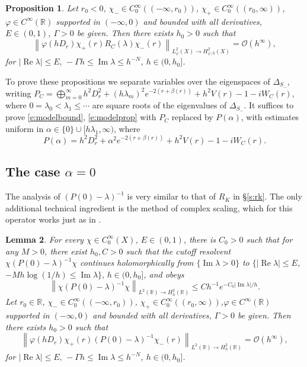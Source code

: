 \documentclass[reqno, 12pt]{amsart}
\newcommand \R {\mathbb{R}}
\newcommand \Oh {\mathcal{O}}
\DeclareMathOperator \re {Re}
\DeclareMathOperator \im {Im}
\newtheorem{prop}{Proposition}
\newtheorem{lem}[prop]{Lemma}
\theoremstyle{definition}
\numberwithin{equation}{section}
\numberwithin{prop}{section}
\numberwithin{figure}{section}
\begin{document}
\begin{prop}\label{p:modelprop}
Let $r_0 <0$, $\chi_- \in C_0^\infty((-\infty,r_0))$, $\chi_+ \in C_0^\infty((r_0,\infty))$, $\varphi \in C^\infty(\R)$ supported in $(-\infty,0)$ and bounded with all derivatives, $E \in (0,1)$, $\Gamma>0$ be given. Then there exists $h_0>0$ such that
\begin{equation}\label{e:modelprop}
\left\|\varphi(hD_r)\chi_+(r)R_C(\lambda)\chi_-(r)\right\|_{L^2_\varphi(X) \to H^2_{\varphi,h}(X)} = \Oh(h^\infty),
\end{equation}
 for $|\re \lambda| \le E, \, - \Gamma h \le \im \lambda \le h^{-N}$, $h \in (0,h_0]$.
 \end{prop}

To prove these propositions we separate variables over the eigenspaces of $\Delta_{S_-}$, writing $P_C = \bigoplus_{m=0}^\infty  h^2D_r^2 + (h\lambda_m)^2 e^{-2(r + \beta(r))} + h^2 V(r) - 1 - iW_C(r),$ 
where $0 = \lambda_0 < \lambda_1  \le \cdots$ are square roots of the eigenvalues of $\Delta_{S_-}$. It suffices to prove \eqref{e:modelbound}, \eqref{e:modelprop} with $P_C$ replaced by $P(\alpha)$,  with estimates uniform in $\alpha \in \{0\} \cup [h\lambda_1,\infty)$, where
\[
P(\alpha) = h^2D_r^2 + \alpha^2e^{-2(r + \beta(r))} + h^2 V(r) - 1 - iW_C(r).
\]

\subsection{The case $\alpha = 0$}  The analysis of $(P(0) - \lambda)^{-1}$ is very similar to that of $R_K$ in \S\ref{s:rk}. The only additional technical ingredient is the method of complex scaling, which for this operator works just as in \cite{sz2,sz}.

\begin{lem}\label{l:p0}
For every $\chi \in C_0^\infty(X)$, $E \in (0,1)$, there is $C_0>0$ such that for any $M>0$, there exist $h_0,C>0$  such that the cutoff resolvent $\chi(P(0) - \lambda)^{-1}\chi$  continues holomorphically from $\{\im \lambda>0\}$ to $\{|\re \lambda| \le E$, $-Mh\log(1/h) \le \im \lambda\}, \, h \in (0,h_0]$, and obeys
\begin{equation}\label{e:modelbound0}
\left\|\chi(P(0) - \lambda)^{-1}\chi\right\|_{L^2(\R) \to H^2_h(\R)} \le C h^{-1}e^{-C_0 |\im \lambda|  /h}. \end{equation}
Let $r_0 \in \R$, $\chi_- \in C_0^\infty((-\infty,r_0))$, $\chi_+ \in C_0^\infty((r_0,\infty))$,$\varphi \in C^\infty(\R)$ supported in $(-\infty,0)$ and bounded with all derivatives, $\Gamma>0$ be given. Then there exists $h_0>0$ such that
\begin{equation}\label{e:modelprop0}
\left\|\varphi(hD_r)\chi_+(r)(P(0) - \lambda)^{-1}\chi_-(r)\right\|_{L^2(\R) \to H^2_h(\R)} = \Oh(h^\infty),
\end{equation}
 for $|\re \lambda| \le E, \, - \Gamma h \le \im \lambda \le h^{-N}$, $h \in (0,h_0]$. \end{lem}
\end{document}
